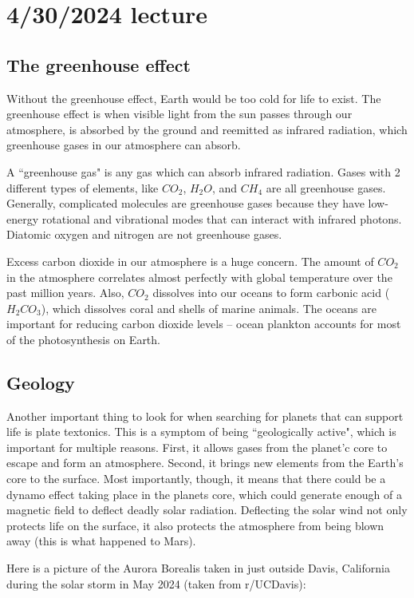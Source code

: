 \documentclass[class=article, crop=false]{standalone}
\begin{document}
\section{4/30/2024 lecture}
\subsection{The greenhouse effect}
Without the greenhouse effect, Earth would be too cold for life to exist. The greenhouse effect is when visible light from the sun passes through our atmosphere, is absorbed by the ground and reemitted as infrared radiation, which greenhouse gases in our atmosphere can absorb.
\par
A ``greenhouse gas" is any gas which can absorb infrared radiation. Gases with 2 different types of elements, like $CO_2$, $H_2O$, and $CH_4$ are all greenhouse gases. Generally, complicated molecules are greenhouse gases because they have low-energy rotational and vibrational modes that can interact with infrared photons. Diatomic oxygen and nitrogen are not greenhouse gases.
\par
Excess carbon dioxide in our atmosphere is a huge concern. The amount of $CO_2$ in the atmosphere correlates almost perfectly with global temperature over the past million years. Also, $CO_2$ dissolves into our oceans to form carbonic acid ($H_2CO_3$), which dissolves coral and shells of marine animals. The oceans are important for reducing carbon dioxide levels -- ocean plankton accounts for most of the photosynthesis on Earth.
\subsection{Geology}
Another important thing to look for when searching for planets that can support life is plate textonics. This is a symptom of being ``geologically active", which is important for multiple reasons. First, it allows gases from the planet'c core to escape and form an atmosphere. Second, it brings new elements from the Earth's core to the surface. Most importantly, though, it means that there could be a dynamo effect taking place in the planets core, which could generate enough of a magnetic field to deflect deadly solar radiation. Deflecting the solar wind not only protects life on the surface, it also protects the atmosphere from being blown away (this is what happened to Mars).
\par
Here is a picture of the Aurora Borealis taken in just outside Davis, California during the solar storm in May 2024 (taken from r/UCDavis):
\end{document}
